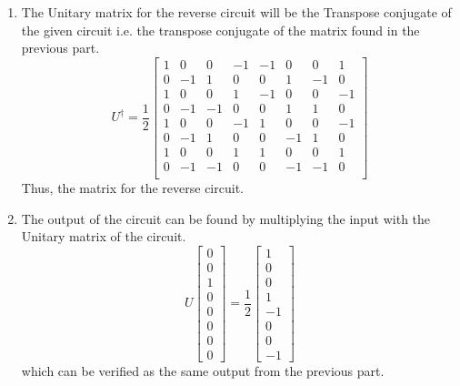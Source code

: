 \begin{example}
\begin{enumerate}
\begin{align*}
\begin{bmatrix}
                0 & -1 & 0 & 1 & 0 & 1 & 0 & -1 \\
                1 & 0 & -1 & 0 & -1 & 0 & 1 & 0 \\
            \end{bmatrix}
        \end{align*}
        \item The Unitary matrix for the reverse circuit will be the Transpose conjugate of the given circuit i.e. the transpose conjugate of the matrix found in the previous part.
        \[
            U^{\dagger}=\frac{1}{2}\begin{bmatrix} 
                1 & 0 & 0 & -1 & -1 & 0 & 0 & 1 \\
                0 & -1 & 1 & 0 & 0 & 1 & -1 & 0 \\
                1 & 0 & 0 & 1 & -1 & 0 & 0 & -1 \\
                0 & -1 & -1 & 0 & 0 & 1 & 1 & 0 \\
                1 & 0 & 0 & -1 & 1 & 0 & 0 & -1 \\
                0 & -1 & 1 & 0 & 0 & -1 & 1 & 0 \\
                1 & 0 & 0 & 1 & 1 & 0 & 0 & 1 \\
                0 & -1 & -1 & 0 & 0 & -1 & -1 & 0 \\
            \end{bmatrix}
        \]
        Thus, the matrix for the reverse circuit.
        \item The output of the circuit can be found by multiplying the input with the Unitary matrix of the circuit.
        \[
            U\begin{bmatrix} 0 \\ 0 \\ 1 \\ 0 \\ 0 \\ 0 \\ 0 \\ 0 \end{bmatrix}=\frac{1}{2}\begin{bmatrix} 1 \\ 0 \\ 0 \\ 1 \\ -1 \\ 0 \\ 0 \\ -1 \end{bmatrix}
        \]
        which can be verified as the same output from the previous part.
    \end{enumerate}
\end{example}


